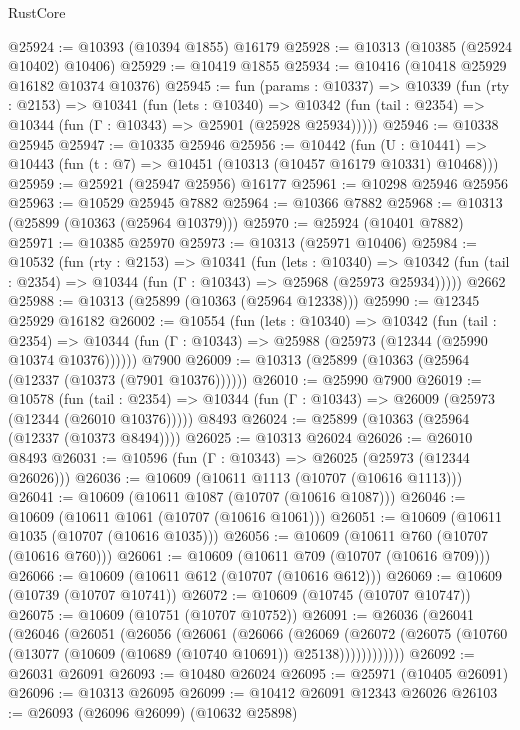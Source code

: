 \begin{lexlean}{RustCore}
\begin{coremodule}
@25924 := @10393 (@10394 @1855) @16179
@25928 := @10313 (@10385 (@25924 @10402) @10406)
@25929 := @10419 @1855
@25934 := @10416 (@10418 @25929 @16182 @10374 @10376)
@25945 := fun (params : @10337) =>
  @10339
    (fun (rty : @2153) =>
    @10341
      (fun (lets : @10340) =>
      @10342 (fun (tail : @2354) => @10344 (fun (Γ : @10343) => @25901 (@25928 @25934)))))
@25946 := @10338 @25945
@25947 := @10335 @25946
@25956 := @10442
    (fun (U : @10441) => @10443 (fun (t : @7) => @10451 (@10313 (@10457 @16179 @10331) @10468)))
@25959 := @25921 (@25947 @25956) @16177
@25961 := @10298 @25946 @25956
@25963 := @10529 @25945 @7882
@25964 := @10366 @7882
@25968 := @10313 (@25899 (@10363 (@25964 @10379)))
@25970 := @25924 (@10401 @7882)
@25971 := @10385 @25970
@25973 := @10313 (@25971 @10406)
@25984 := @10532
    (fun (rty : @2153) =>
    @10341
      (fun (lets : @10340) =>
      @10342 (fun (tail : @2354) => @10344 (fun (Γ : @10343) => @25968 (@25973 @25934)))))
    @2662
@25988 := @10313 (@25899 (@10363 (@25964 @12338)))
@25990 := @12345 @25929 @16182
@26002 := @10554
    (fun (lets : @10340) =>
    @10342
      (fun (tail : @2354) =>
      @10344 (fun (Γ : @10343) => @25988 (@25973 (@12344 (@25990 @10374 @10376))))))
    @7900
@26009 := @10313 (@25899 (@10363 (@25964 (@12337 (@10373 (@7901 @10376))))))
@26010 := @25990 @7900
@26019 := @10578
    (fun (tail : @2354) => @10344 (fun (Γ : @10343) => @26009 (@25973 (@12344 (@26010 @10376)))))
    @8493
@26024 := @25899 (@10363 (@25964 (@12337 (@10373 @8494))))
@26025 := @10313 @26024
@26026 := @26010 @8493
@26031 := @10596 (fun (Γ : @10343) => @26025 (@25973 (@12344 @26026)))
@26036 := @10609 (@10611 @1113 (@10707 (@10616 @1113)))
@26041 := @10609 (@10611 @1087 (@10707 (@10616 @1087)))
@26046 := @10609 (@10611 @1061 (@10707 (@10616 @1061)))
@26051 := @10609 (@10611 @1035 (@10707 (@10616 @1035)))
@26056 := @10609 (@10611 @760 (@10707 (@10616 @760)))
@26061 := @10609 (@10611 @709 (@10707 (@10616 @709)))
@26066 := @10609 (@10611 @612 (@10707 (@10616 @612)))
@26069 := @10609 (@10739 (@10707 @10741))
@26072 := @10609 (@10745 (@10707 @10747))
@26075 := @10609 (@10751 (@10707 @10752))
@26091 := @26036
    (@26041
      (@26046
        (@26051
          (@26056
            (@26061
              (@26066
                (@26069
                  (@26072
                    (@26075 (@10760 (@13077 (@10609 (@10689 (@10740 @10691)) @25138))))))))))))
@26092 := @26031 @26091
@26093 := @10480 @26024
@26095 := @25971 (@10405 @26091)
@26096 := @10313 @26095
@26099 := @10412 @26091 @12343 @26026
@26103 := @26093 (@26096 @26099) (@10632 @25898)

\end{coremodule}
\end{lexlean}
